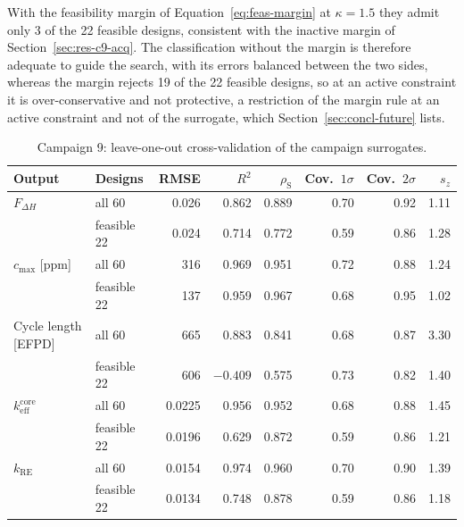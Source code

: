\begin{itemize}
\begin{itemize}
                With the feasibility margin of
                Equation~\eqref{eq:feas-margin} at $\kappa = 1.5$ they
                admit only 3 of the 22 feasible designs, consistent with
                the inactive margin of Section~\ref{sec:res-c9-acq}. The
                classification without the margin is therefore adequate
                to guide the search, with its errors balanced between
                the two sides, whereas the margin rejects 19 of the 22
                feasible designs, so at an active constraint it is
                over-conservative and not protective, a restriction of the
                margin rule at an active constraint and not of the
                surrogate, which Section~\ref{sec:concl-future} lists.
        \end{itemize}

\begin{table}[htbp]
  \centering
  \small
  \caption{Campaign 9: leave-one-out cross-validation of the campaign surrogates.}
  \label{tab:c9-cv}
  \setlength{\tabcolsep}{4pt}
  \begin{tabular}{@{}llrrrrrr@{}}
    \toprule
    Output & Designs & RMSE & $R^2$ & $\rho_\mathrm{S}$ & Cov.\ $1\sigma$ & Cov.\ $2\sigma$ & $s_z$ \\
    \midrule
    $F_{\Delta H}$ & all 60 & 0.026 & 0.862 & 0.889 & 0.70 & 0.92 & 1.11 \\
     & feasible 22 & 0.024 & 0.714 & 0.772 & 0.59 & 0.86 & 1.28 \\
    $c_\mathrm{max}$ [ppm] & all 60 & 316 & 0.969 & 0.951 & 0.72 & 0.88 & 1.24 \\
     & feasible 22 & 137 & 0.959 & 0.967 & 0.68 & 0.95 & 1.02 \\
    Cycle length [EFPD] & all 60 & 665 & 0.883 & 0.841 & 0.68 & 0.87 & 3.30 \\
     & feasible 22 & 606 & $-0.409$ & 0.575 & 0.73 & 0.82 & 1.40 \\
    $k_\mathrm{eff}^\mathrm{core}$ & all 60 & 0.0225 & 0.956 & 0.952 & 0.68 & 0.88 & 1.45 \\
     & feasible 22 & 0.0196 & 0.629 & 0.872 & 0.59 & 0.86 & 1.21 \\
    $k_\mathrm{RE}$ & all 60 & 0.0154 & 0.974 & 0.960 & 0.70 & 0.90 & 1.39 \\
     & feasible 22 & 0.0134 & 0.748 & 0.878 & 0.59 & 0.86 & 1.18 \\
    \bottomrule
  \end{tabular}
\end{table}


\end{itemize}
